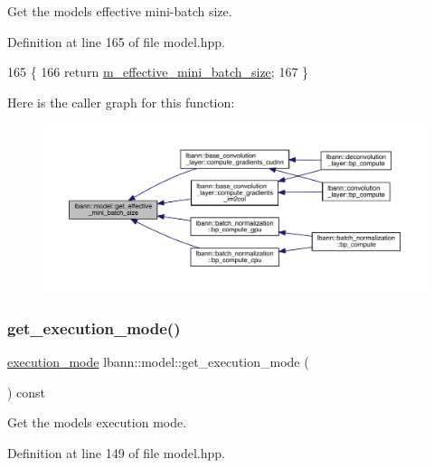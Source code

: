 Get the model\textquotesingle{}s effective mini-\/batch size. 

Definition at line 165 of file model.\+hpp.


\begin{DoxyCode}
165                                                    \{
166     \textcolor{keywordflow}{return} \hyperlink{classlbann_1_1model_a4887fd2816e7c51b24cb8bf8e4a80a1c}{m\_effective\_mini\_batch\_size};
167   \}
\end{DoxyCode}
Here is the caller graph for this function\+:\nopagebreak
\begin{figure}[H]
\begin{center}
\leavevmode
\includegraphics[width=350pt]{classlbann_1_1model_a2a9b4cfa1c8c91e4131908751f9c4a6a_icgraph}
\end{center}
\end{figure}
\mbox{\label{classlbann_1_1model_addb40597cf29aa6d31b6a7d09ef48608}} 
\subsubsection{\texorpdfstring{get\+\_\+execution\+\_\+mode()}{get\_execution\_mode()}}
{\footnotesize\ttfamily \hyperlink{base_8hpp_a2781a159088df64ed7d47cc91c4dc0a8}{execution\+\_\+mode} lbann\+::model\+::get\+\_\+execution\+\_\+mode (\begin{DoxyParamCaption}{ }\end{DoxyParamCaption}) const\hspace{0.3cm}{\ttfamily [inline]}}

Get the model\textquotesingle{}s execution mode. 

Definition at line 149 of file model.\+hpp.


